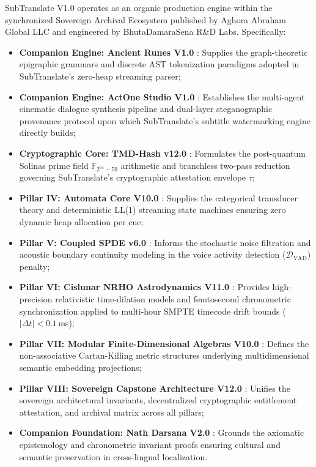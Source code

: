 \documentclass[11pt,a4paper,reqno]{article}
\theoremstyle{definition}
\theoremstyle{remark}
\begin{document}
SubTranslate V1.0 operates as an organic production engine within the synchronized Sovereign Archival Ecosystem published by Aghora Abraham Global LLC and engineered by BhutaDamaraSena R\&D Labs. Specifically:
\begin{itemize}
    \item \textbf{Companion Engine: Ancient Runes V1.0} \cite{ancient_runes_v1}: Supplies the graph-theoretic epigraphic grammars and discrete AST tokenization paradigms adopted in SubTranslate's zero-heap streaming parser;
    \item \textbf{Companion Engine: ActOne Studio V1.0} \cite{actone_v1}: Establishes the multi-agent cinematic dialogue synthesis pipeline and dual-layer steganographic provenance protocol upon which SubTranslate's subtitle watermarking engine directly builds;
    \item \textbf{Cryptographic Core: TMD-Hash v12.0} \cite{tmd_hash_v12}: Formulates the post-quantum Solinas prime field $\mathbb{F}_{2^{64}-59}$ arithmetic and branchless two-pass reduction governing SubTranslate's cryptographic attestation envelope $\tau$;
    \item \textbf{Pillar IV: Automata Core V10.0} \cite{automata_v10}: Supplies the categorical transducer theory and deterministic LL(1) streaming state machines ensuring zero dynamic heap allocation per cue;
    \item \textbf{Pillar V: Coupled SPDE v6.0} \cite{spde_v6}: Informs the stochastic noise filtration and acoustic boundary continuity modeling in the voice activity detection ($\mathcal{D}_{\mathrm{VAD}}$) penalty;
    \item \textbf{Pillar VI: Cislunar NRHO Astrodynamics V11.0} \cite{cislunar_v11}: Provides high-precision relativistic time-dilation models and femtosecond chronometric synchronization applied to multi-hour SMPTE timecode drift bounds ($|\Delta t| < 0.1$\,ms);
    \item \textbf{Pillar VII: Modular Finite-Dimensional Algebras V10.0} \cite{finite_dim_v10}: Defines the non-associative Cartan-Killing metric structures underlying multidimensional semantic embedding projections;
    \item \textbf{Pillar VIII: Sovereign Capstone Architecture V12.0} \cite{pillar_viii_capstone}: Unifies the sovereign architectural invariants, decentralized cryptographic entitlement attestation, and archival matrix across all pillars;
    \item \textbf{Companion Foundation: Nath Darsana V2.0} \cite{nath_darsana_v2}: Grounds the axiomatic epistemology and chronometric invariant proofs ensuring cultural and semantic preservation in cross-lingual localization.
\end{itemize}
\end{document}
